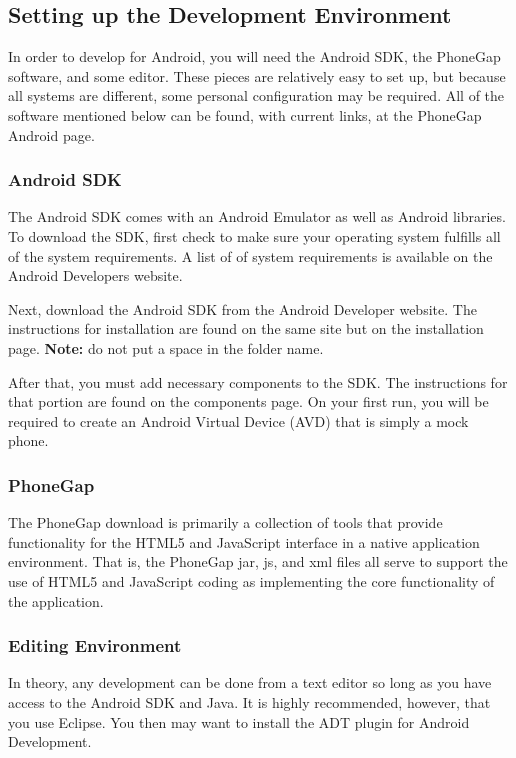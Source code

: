 \documentclass[12pt]{article}
\begin{document}
\subsection{Setting up the Development Environment}
In order to develop for Android, you will need the Android SDK, the PhoneGap software, and some editor.  These pieces are relatively easy to set up, but because all systems are different, some personal configuration may be required.  All of the software mentioned below can be found, with current links, at the PhoneGap Android page\cite{PhoneGap-Android}.  

\subsubsection{Android SDK}
The Android SDK comes with an Android Emulator as well as Android libraries.
To download the SDK, first check to make sure your operating system fulfills all of the system requirements.  A list of of system requirements is available on the Android Developers website\cite{AndroidSDK-SystemRequirements}.

Next, download the Android SDK from the Android Developer website\cite{AndroidSDK-Download}.
The instructions for installation are found on the same site but on the installation page\cite{AndroidSDK-Installation}. \textbf{Note:} do not put a space in the folder name.

After that, you must add necessary components to the SDK.  The instructions for that portion are found on the components page\cite{AndroidSDK-Components}.  On your first run, you will be required to create an Android Virtual Device (AVD) that is simply a mock phone.


\subsubsection{PhoneGap}
The PhoneGap download is primarily a collection of tools that provide functionality for the HTML5 and JavaScript interface in a native application environment.  That is, the PhoneGap jar, js, and xml files all serve to support the use of HTML5 and JavaScript coding as implementing the core functionality of the application.   

\subsubsection{Editing Environment}
In theory, any development can be done from a text editor so long as you have access to the Android SDK and Java.  It is highly recommended, however, that you use Eclipse\cite{Eclipse-Helios}.  You then may want to install the ADT plugin for Android Development\cite{Eclipse-ADT}.
\end{document}
